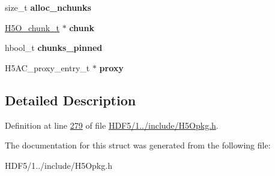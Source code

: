 \begin{DoxyCompactItemize}
\mbox{\label{struct_h5_o__t_adf51e7e095568c593f005f640f9a1e4d}} 
size\+\_\+t {\bfseries alloc\+\_\+nchunks}
\item 
\mbox{\label{struct_h5_o__t_a315d4dca96301d2a85ef53c2c0a7ec8c}} 
\hyperlink{struct_h5_o__chunk__t}{H5\+O\+\_\+chunk\+\_\+t} $\ast$ {\bfseries chunk}
\item 
\mbox{\label{struct_h5_o__t_aefd563dd7850d07e0ede630de555360d}} 
hbool\+\_\+t {\bfseries chunks\+\_\+pinned}
\item 
\mbox{\label{struct_h5_o__t_a832c6f483f3af2b3bf481bb18b305361}} 
H5\+A\+C\+\_\+proxy\+\_\+entry\+\_\+t $\ast$ {\bfseries proxy}
\end{DoxyCompactItemize}


\subsection{Detailed Description}


Definition at line \hyperlink{_h_d_f5_21_810_81_2include_2_h5_opkg_8h_source_l00279}{279} of file \hyperlink{_h_d_f5_21_810_81_2include_2_h5_opkg_8h_source}{H\+D\+F5/1../include/\+H5\+Opkg.\+h}.



The documentation for this struct was generated from the following file\+:\begin{DoxyCompactItemize}
\item 
H\+D\+F5/1../include/\+H5\+Opkg.\+h\end{DoxyCompactItemize}
